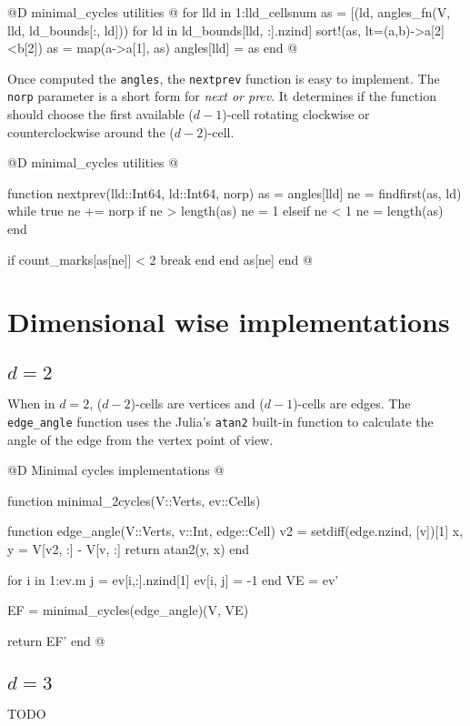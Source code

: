 \documentclass[10pt]{book}
\begin{document}
@D minimal\_cycles utilities
@{
for lld in 1:lld_cellsnum
    as = [(ld, angles_fn(V, lld, ld_bounds[:, ld])) 
        for ld in ld_bounds[lld, :].nzind]
    sort!(as, lt=(a,b)->a[2]<b[2])
    as = map(a->a[1], as)
    angles[lld] = as
end
@}

Once computed the \texttt{angles}, the \texttt{nextprev} function is
easy to implement. The \texttt{norp} parameter is a short form for \textit{next or prev}. 
It determines if the function should choose the first available
($d-1$)-cell rotating clockwise or counterclockwise around the ($d-2$)-cell.

@D minimal\_cycles utilities
@{function nextprev(lld::Int64, ld::Int64, norp)
    as = angles[lld]
    ne = findfirst(as, ld)
    while true
        ne += norp
        if ne > length(as)
            ne = 1
        elseif ne < 1
            ne = length(as)
        end

        if count_marks[as[ne]] < 2
            break
        end
    end
    as[ne]
end
@}



\section{Dimensional wise implementations}
\label{sec:angles_fn}

\subsection{$d=2$}

When in $d=2$, ($d-2$)-cells are vertices and ($d-1$)-cells are edges.
The \texttt{edge\_angle} function uses the Julia's \texttt{atan2} 
built-in function to calculate the angle of the edge from the vertex point of view.

@D Minimal cycles implementations
@{function minimal_2cycles(V::Verts, ev::Cells)

    function edge_angle(V::Verts, v::Int, edge::Cell)
        v2 = setdiff(edge.nzind, [v])[1]
        x, y = V[v2, :] - V[v, :]
        return atan2(y, x)
    end

    for i in 1:ev.m
        j = ev[i,:].nzind[1]
        ev[i, j] = -1
    end
    VE = ev'

    EF = minimal_cycles(edge_angle)(V, VE)

    return EF'
end
@}

\subsection{$d=3$}

TODO


\backmatter


{}

\end{document}
